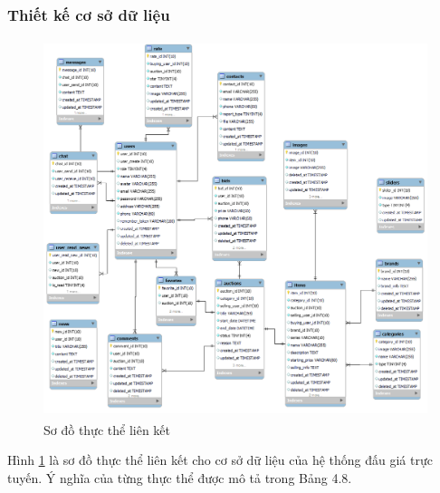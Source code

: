 \documentclass{article}
\begin{document}
\subsubsection{Thiết kế cơ sở dữ liệu}
\begin{figure}[H]
    \centering
    \includegraphics[width=11.4cm,height=11.0cm]{images/database.png}
    \caption{Sơ đồ thực thể liên kết}
    \label{hinh413}
\end{figure}
Hình \ref{hinh413} là sơ đồ thực thể liên kết cho cơ sở dữ liệu của hệ thống đấu giá trực tuyến. Ý nghĩa của từng thực thể được mô tả trong Bảng 4.8.
\end{document}
